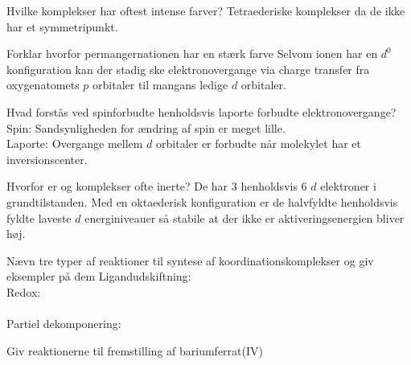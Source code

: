 \begin{flashcard}[Teori]{Hvilke komplekser har oftest intense farver?}
Tetraederiske komplekser da de ikke har et symmetripunkt.
\end{flashcard}


\begin{flashcard}[Egenskab]{Forklar hvorfor permangernationen har en stærk farve}
Selvom ionen har en $d^{0}$ konfiguration kan der stadig ske elektronovergange via charge transfer fra oxygenatomets $p$ orbitaler til mangans ledige $d$ orbitaler.
\end{flashcard}


\begin{flashcard}[Teori]{Hvad forstås ved spinforbudte henholdsvis laporte forbudte elektronovergange?}
Spin: Sandsynligheden for ændring af spin er meget lille.\\
Laporte: Overgange mellem $d$ orbitaler er forbudte når molekylet har et inversionscenter.
\end{flashcard}


\begin{flashcard}[Egenskab]{Hvorfor er  og  komplekser ofte inerte?}
De har 3 henholdsvis 6 $d$ elektroner i grundtilstanden. Med en oktaederisk konfiguration er de halvfyldte henholdsvis fyldte laveste $d$ energiniveauer så stabile at der ikke er aktiveringsenergien bliver høj.
\end{flashcard}


\begin{flashcard}[Teori]{Nævn tre typer af reaktioner til syntese af koordinationskomplekser og giv eksempler på dem}
Ligandudskiftning: \\\vspace*{0.5cm}
Redox:\\\\\vspace*{0.5cm}
Partiel dekomponering: 
\end{flashcard}


\begin{flashcard}[Fremstilling]{Giv reaktionerne til fremstilling af bariumferrat(IV)}
\\\vspace*{0.5cm}
\end{flashcard}

